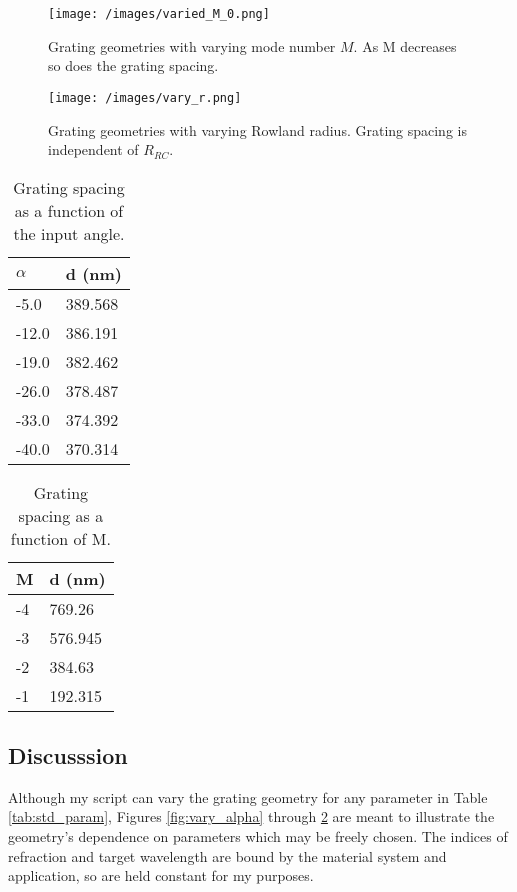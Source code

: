 \documentclass{article}
\begin{document}
    \begin{figure}[H]        
    \centering
    \scriptsize 
    \texttt{[image: /images/varied\_M\_0.png]}
    \caption{\label{fig:vary_M} Grating geometries with varying mode number $M$. As M decreases so does the grating spacing.}
    \end{figure}
    
    \begin{figure}[H]        
    \centering
    \scriptsize 
    \texttt{[image: /images/vary\_r.png]}
    \caption{\label{fig:vary_R} Grating geometries with varying Rowland radius. Grating spacing is independent of $R_{RC}$.}
    \end{figure}
    
     \begin{table}[H]
    \centering
    \caption{Grating spacing as a function of the input angle.}
    \label{tab:d_vs_alpha}
    \begin{tabular}{|l|l|}
    \hline
    $\alpha$ & d (nm)  \\ \hline
    -5.0     & 389.568 \\ \hline
    -12.0    & 386.191 \\ \hline
    -19.0    & 382.462 \\ \hline
    -26.0    & 378.487 \\ \hline
    -33.0    & 374.392 \\ \hline
    -40.0    & 370.314 \\ \hline
    \end{tabular}
    \end{table}
    
    \begin{table}[H]
    \centering
    \caption{Grating spacing as a function of M.}
    \label{tab:vary_m}
    \begin{tabular}{|l|l|}
    \hline
    M  & d (nm)  \\ \hline
    -4 & 769.26  \\ \hline
    -3 & 576.945 \\ \hline
    -2 & 384.63  \\ \hline
    -1 & 192.315 \\ \hline
    \end{tabular}
    \end{table}
    
    \subsection{Discusssion}
    Although my script can vary the grating geometry for any parameter in Table \ref{tab:std_param}, Figures \ref{fig:vary_alpha} through \ref{fig:vary_R} are meant to illustrate the geometry's dependence on parameters which may be freely chosen. The indices of refraction and target wavelength are bound by the material system and application, so are held constant for my purposes. 
    
\end{document}
